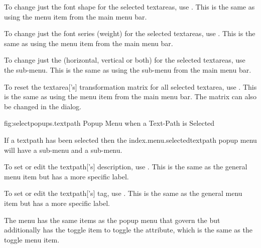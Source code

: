 
To change just the font shape for the selected \glspl{textarea},
use . This is the same as using the
 menu item from the main menu bar.


To change just the font series (weight) for the selected \glspl{textarea},
use . This is the same as using the
 menu item from the main menu bar.


To change just the  (horizontal, vertical or both) for the
selected \glspl{textarea}, use the 
sub-menu. This is the same as using the
 sub-menu from the main menu
bar.


To reset the \gls{textarea}['s] transformation matrix for all
selected \gls{textarea}, use .
This is the same as using the  menu item from
the main menu bar. The matrix can also be changed in the
 dialog.



\FloatFig
  {fig:selectpopups.textpath}
  {}
  {Popup Menu when a Text-Path is Selected}


If a \gls{textpath} has been selected then the
\gls{index.menu.selectedtextpath} popup menu will have a 
 sub-menu and a  
sub-menu.


To set or edit the \gls{textpath}['s] description, use
. This is the same as
the general  menu item 
but has a more specific label.


To set or edit the \gls{textpath}['s] tag, use
. This is the same as
the general  menu item but has a more specific label.

The  menu has the same items as the
 popup menu that govern the 
but additionally has the  toggle
item to toggle the  attribute, which 
is the same as the  toggle menu
item.

